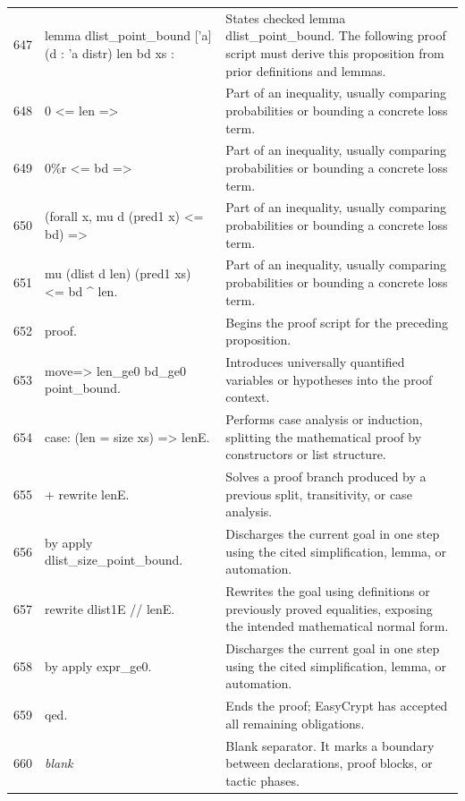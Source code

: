 \documentclass[10pt]{article}
\begin{document}
\begin{longtable}{r L{0.53\textwidth} L{0.37\textwidth}}
647 & {\ttfamily\scriptsize lemma dlist\_point\_bound ['a] (d : 'a distr) len bd xs :} & States checked lemma dlist\_point\_bound.  The following proof script must derive this proposition from prior definitions and lemmas. \\
648 & {\ttfamily\scriptsize   0 <= len =>} & Part of an inequality, usually comparing probabilities or bounding a concrete loss term. \\
649 & {\ttfamily\scriptsize   0\%r <= bd =>} & Part of an inequality, usually comparing probabilities or bounding a concrete loss term. \\
650 & {\ttfamily\scriptsize   (forall x, mu d (pred1 x) <= bd) =>} & Part of an inequality, usually comparing probabilities or bounding a concrete loss term. \\
651 & {\ttfamily\scriptsize   mu (dlist d len) (pred1 xs) <= bd \textasciicircum{} len.} & Part of an inequality, usually comparing probabilities or bounding a concrete loss term. \\
652 & {\ttfamily\scriptsize proof.} & Begins the proof script for the preceding proposition. \\
653 & {\ttfamily\scriptsize move=> len\_ge0 bd\_ge0 point\_bound.} & Introduces universally quantified variables or hypotheses into the proof context. \\
654 & {\ttfamily\scriptsize case: (len = size xs) => lenE.} & Performs case analysis or induction, splitting the mathematical proof by constructors or list structure. \\
655 & {\ttfamily\scriptsize + rewrite lenE.} & Solves a proof branch produced by a previous split, transitivity, or case analysis. \\
656 & {\ttfamily\scriptsize   by apply dlist\_size\_point\_bound.} & Discharges the current goal in one step using the cited simplification, lemma, or automation. \\
657 & {\ttfamily\scriptsize rewrite dlist1E // lenE.} & Rewrites the goal using definitions or previously proved equalities, exposing the intended mathematical normal form. \\
658 & {\ttfamily\scriptsize by apply expr\_ge0.} & Discharges the current goal in one step using the cited simplification, lemma, or automation. \\
659 & {\ttfamily\scriptsize qed.} & Ends the proof; EasyCrypt has accepted all remaining obligations. \\
660 & {\ttfamily\scriptsize \emph{blank}} & Blank separator.  It marks a boundary between declarations, proof blocks, or tactic phases. \\

\end{longtable}
\end{document}
